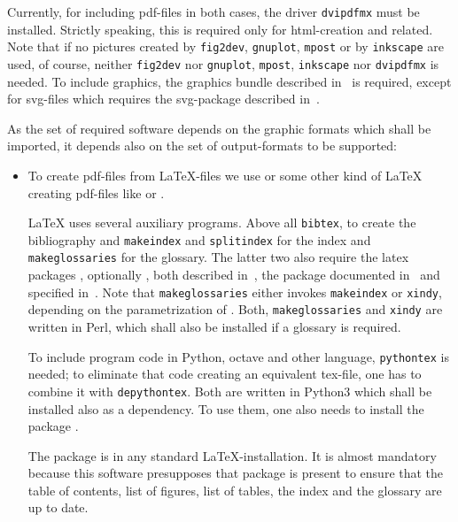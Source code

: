 Currently, for including pdf-files in both cases, 
the driver \texttt{dvipdfmx} must be installed. 
Strictly speaking, this is required only for html-creation and related. 
Note that if no pictures created by \texttt{fig2dev}, \texttt{gnuplot}, 
\texttt{mpost} or by \texttt{inkscape} are used, of course, 
neither \texttt{fig2dev} nor \texttt{gnuplot},
\texttt{mpost}, \texttt{inkscape} 
nor \texttt{dvipdfmx} is needed. 
To include graphics, the graphics bundle described in~\cite{GraX} is required, 
except for svg-files which requires the svg-package 
described in~\cite{SvgP}. 

As the set of required software depends on the graphic formats 
which shall be imported, 
it depends also on the set of output-formats 
to be supported: 
%
\begin{itemize}
\item
To create pdf-files from \LaTeX-files we use \lualatex{} 
or some other kind of \LaTeX{} creating pdf-files 
like \xelatex{} or \pdflatex{}. 

\LaTeX{} uses several auxiliary programs. 
Above all \texttt{bibtex}, to create the bibliography 
and \texttt{makeindex} and \texttt{splitindex} for the index 
and \texttt{makeglossaries} for the glossary. 
The latter two 
also require the latex packages , optionally , 
both described in~\cite{MkidxShIdxP}, 
the package  documented in~\cite{SplitidxP}
and  specified in~\cite{GloP}. 
Note that \texttt{makeglossaries} either invokes \texttt{makeindex} 
or \texttt{xindy}, depending on the parametrization of . 
Both, \texttt{makeglossaries} and \texttt{xindy} are written in Perl, 
which shall also be installed if a glossary is required. 

To include program code in Python, octave and other language, 
\texttt{pythontex} is needed; to eliminate that code creating an equivalent tex-file, 
one has to combine it with \texttt{depythontex}. 
Both are written in Python3 which shall be installed also as a dependency. 
To use them, one also needs to install the package . 

The package  is in any standard \LaTeX-installation. 
It is almost mandatory 
because this software presupposes that package is present  
to ensure that the table of contents, list of figures, list of tables, 
the index and the glossary are up to date. 


\end{itemize}
